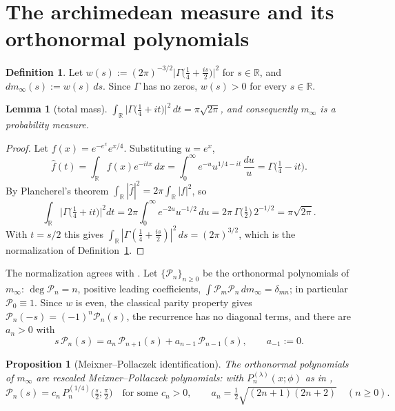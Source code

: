 \documentclass[11pt]{amsart}
\newtheorem{proposition}[theorem]{Proposition}
\newtheorem{lemma}[theorem]{Lemma}
\theoremstyle{definition}
\newtheorem{definition}[theorem]{Definition}
\theoremstyle{remark}
\newcommand{\bbR}{\mathbb{R}}
\newcommand{\minf}{m_\infty}
\begin{document}
\section{The archimedean measure and its orthonormal polynomials}
\label{sec:setup}

\begin{definition}\label{def:minf}
Let
$w(s):=(2\pi)^{-3/2}\bigl|\Gamma\bigl(\tfrac14+\tfrac{is}{2}\bigr)\bigr|^{2}$
for $s\in\bbR$, and $d\minf(s):=w(s)\,ds$. Since $\Gamma$ has no zeros,
$w(s)>0$ for every $s\in\bbR$.
\end{definition}

\begin{lemma}[total mass]\label{lem:mass}
$\displaystyle\int_{\bbR}\bigl|\Gamma\bigl(\tfrac14+it\bigr)\bigr|^{2}\,dt
=\pi\sqrt{2\pi}$, and consequently $\minf$ is a probability measure.
\end{lemma}

\begin{proof}
Let $f(x)=e^{-e^{x}}e^{x/4}$. Substituting $u=e^{x}$,
\[
\widehat f(t)=\int_{\bbR}f(x)e^{-itx}\,dx
=\int_0^\infty e^{-u}u^{1/4-it}\,\frac{du}{u}
=\Gamma\bigl(\tfrac14-it\bigr).
\]
By Plancherel's theorem $\int_{\bbR}|\widehat f|^{2}=2\pi\int_{\bbR}|f|^{2}$,
so
\[
\int_{\bbR}\bigl|\Gamma\bigl(\tfrac14+it\bigr)\bigr|^{2}dt
=2\pi\int_0^\infty e^{-2u}u^{-1/2}\,du
=2\pi\,\Gamma\bigl(\tfrac12\bigr)\,2^{-1/2}
=\pi\sqrt{2\pi}.
\]
With $t=s/2$ this gives
$\int_{\bbR}|\Gamma(\tfrac14+\tfrac{is}{2})|^{2}\,ds=(2\pi)^{3/2}$, which is
the normalization of Definition~\ref{def:minf}.
\end{proof}

The normalization agrees with \cite[Prop.~3.3, Prop.~5.2]{CCMprolate}. Let
$\{\mathcal P_n\}_{n\ge0}$ be the orthonormal polynomials of $\minf$:
$\deg\mathcal P_n=n$, positive leading coefficients,
$\int\mathcal P_m\mathcal P_n\,d\minf=\delta_{mn}$; in particular
$\mathcal P_0\equiv1$. Since $w$ is even, the classical parity property
\cite[\S2.3]{Szego} gives $\mathcal P_n(-s)=(-1)^{n}\mathcal P_n(s)$, the
recurrence has no diagonal terms, and there are $a_n>0$ with
\begin{equation}\label{eq:recurrence}
s\,\mathcal P_n(s)=a_n\,\mathcal P_{n+1}(s)+a_{n-1}\,\mathcal P_{n-1}(s),
\qquad a_{-1}:=0 .
\end{equation}

\begin{proposition}[Meixner--Pollaczek identification]\label{prop:mp}
The orthonormal polynomials of $\minf$ are rescaled Meixner--Pollaczek
polynomials: with $P^{(\lambda)}_n(x;\phi)$ as in \cite[\S9.7]{KLS},
\[
\mathcal P_n(s)=c_n\,P^{(1/4)}_n\bigl(\tfrac s2;\tfrac\pi2\bigr)
\quad\text{for some }c_n>0,
\qquad
a_n=\tfrac12\sqrt{(2n+1)(2n+2)}\quad(n\ge0).
\]
\end{proposition}
\end{document}
